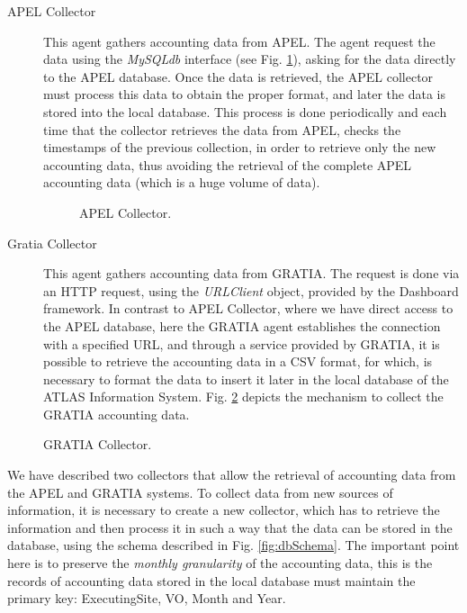 \begin{description}
\item[APEL Collector]
This agent gathers accounting data from APEL.
The agent request the data using the {\itshape MySQLdb} interface
(see Fig. \ref{fig:apelCollector}), asking for the data directly to
the APEL database.
Once the data is retrieved, the APEL collector must process this data
to obtain the proper format, and later the data is stored into the
local database.
This process is done periodically and each time that the collector
retrieves the data from APEL, checks the timestamps of the previous
collection, in order to retrieve only the new accounting data,
thus avoiding the retrieval of the complete APEL accounting data
(which is a huge volume of data).

\begin{figure}[h!tbp]
\centering
{}
\caption{APEL Collector.}
\label{fig:apelCollector}
\end{figure}



\item[Gratia Collector]
This agent gathers accounting data from GRATIA.
The request is done via an HTTP request, using the {\itshape URLClient}
object, provided by the Dashboard framework.
In contrast to APEL Collector, where we have direct access to the APEL
database, here the GRATIA agent establishes the
connection with a specified URL, and through a service provided by
GRATIA, it is possible to retrieve the accounting data in a CSV
format, for which, is necessary to format the data to insert it later
in the local database of the ATLAS Information System.
Fig. \ref{fig:gratiaCollector} depicts the mechanism to collect the
GRATIA accounting data.
\end{description}


\begin{figure}[h!tbp]
\centering
{}
\caption{GRATIA Collector.}
\label{fig:gratiaCollector}
\end{figure}


\newpage
We have described two collectors that allow the retrieval of
accounting data from the APEL and GRATIA systems.
To collect data from new sources of information, it is necessary to
create a new collector, which has to retrieve the information and then
process it in such a way that the data can be stored in the
database, using the  schema described in
Fig. \ref{fig:dbSchema}.
The important point here is to preserve the
{\itshape monthly granularity} of the accounting data, this is the records
of accounting data stored in the local database must maintain the
primary key: ExecutingSite, VO, Month and Year.\\


